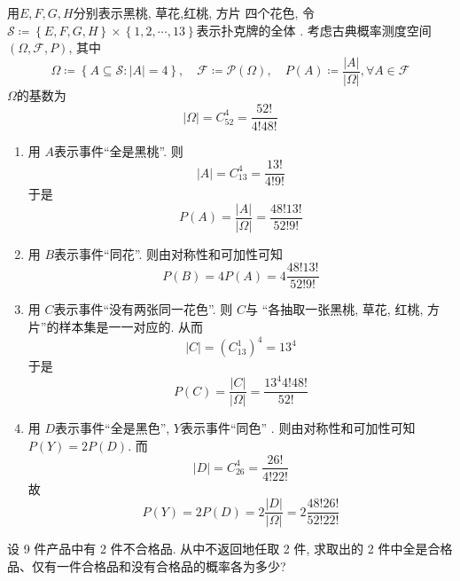 \documentclass[../main.tex]{subfiles}
\begin{document}
\begin{solution}
    用\(  E,F,G,H  \)分别表示黑桃, 草花,红桃, 方片 四个花色, 令 \(  \mathcal{S}\coloneqq \left\{ E,F,G,H \right\} \times \left\{ 1,2,\cdots ,13 \right\} \)表示扑克牌的全体 . 考虑古典概率测度空间 \(  \left(  \Omega ,\mathcal{F},P \right)   \), 其中 \[
     \Omega \coloneqq \left\{ A \subseteq \mathcal{S} : |A| = 4 \right\},\quad \mathcal{F}\coloneqq \mathcal{P}\left(  \Omega  \right),\quad P\left( A \right)\coloneqq \frac{\left| A \right|  }{\left|  \Omega  \right|  },\forall A\in \mathcal{F}   
    \] \(   \Omega   \)的基数为 \[
    \left|  \Omega  \right|= C_{52}^{4}= \frac{52! }{4! 48! }  
    \] \begin{enumerate}
        \item 用 \(  A  \)表示事件``全是黑桃''. 则 \[
    \left| A \right|= C_{13}^{4}= \frac{13! }{4! 9! }  
    \] 于是 \[
    P\left( A \right)= \frac{\left| A \right|  }{\left|  \Omega  \right|  }= \frac{48!13!  }{52! 9!}   
    \]
        \item 用 \(  B  \)表示事件``同花''. 则由对称性和可加性可知 \[
        P\left( B \right)= 4P\left( A \right)= 4 \frac{48!13!  }{52! 9!}
        \] 
        \item 用 \(  C  \)表示事件``没有两张同一花色''. 则 \(  C  \)与 ``各抽取一张黑桃, 草花, 红桃, 方片''的样本集是一一对应的. 从而 \[
        \left| C \right|=  \left( C_{13}^{1} \right)^{4} =  13 ^{4}
        \] 于是 \[
        P\left( C \right)=\frac{\left| C \right|  }{\left|  \Omega  \right|  }=  \frac{13 ^{4} 4! 48! }{52! }   
        \]
        \item 用 \(  D  \)表示事件``全是黑色'', \(  Y  \)表示事件``同色'' .  则由对称性和可加性可知  \(  P\left( Y \right)= 2P\left( D \right)    \). 而 \[
        \left| D \right|= C_{26}^{4}= \frac{26! }{4! 22! }  
        \] 故 \[
        P\left( Y\right)= 2P\left( D \right)= 2\frac{\left| D \right|  }{\left|  \Omega  \right|  }=2 \frac{48!26! }{52!22! }    
        \]
    \end{enumerate}
    
\end{solution}

\begin{exercise}{}{}
设 9 件产品中有 2 件不合格品. 从中不返回地任取 2 件, 求取出的 2 件中全是合格品、仅有一件合格品和没有合格品的概率各为多少?
\end{exercise}
\end{document}
